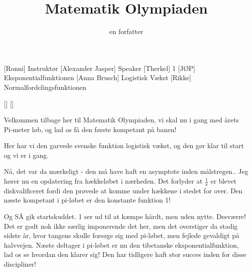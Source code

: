 \documentclass[a4paper,11pt]{article}
\title{Matematik Olympiaden}
\author{en forfatter}
\begin{document}
\maketitle

\begin{roles}
[Ronni] Instruktør
[Alexander Jasper] Speaker
[Therkel] 1
[JØP] Eksponentialfunktionen
[Anna Brusch] Logistisk Vækst
[Rikke] Normalfordelingsfunktionen
\end{roles}

\begin{props}
[]
[]
\end{props}

\begin{sketch}

 Velkommen tilbage her til Matematik Olympiaden, vi skal nu i gang med årets Pi-meter løb, og lad os få den første kompetant på banen!


 Her har vi den garvede svenske funktion logistisk vækst, og den gør klar til start og vi er i gang.



 Nå, det var da mærkeligt - den må have haft en asymptote inden målstregen.. Jeg hører nu en opdatering fra hækkeløbet i nærheden. Det forlyder at $\frac{1}{x}$ er blevet diskvalificeret fordi den prøvede at komme under hækkene i stedet for over. Den næste kompetant i pi-løbet er den konstante funktion 1!


 Og SÅ gik startskuddet. 1 ser ud til at kæmpe hårdt, men uden nytte. Desværre! Det er godt nok ikke særlig imponerende det her, men det overstiger da stadig sidste år, hvor tangens skulle forsøge sig med pi-løbet, men fejlede gevaldigt på halvvejen. Næste deltager i pi-løbet er nu den tibetanske eksponentialfunktion, lad os se hvordan den klarer sig! Den har tidligere haft stor succes inden for disse discipliner!


\end{sketch}
\end{document}
